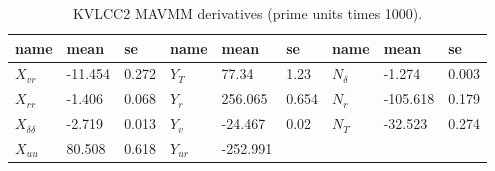 \begin{table}[!htb]
    \footnotesize
    \centering
        \caption{KVLCC2 MAVMM derivatives (prime units times 1000).}
    \label{\detokenize{06.20_results_kvlcc2:kvlcc2-derivatives}}
    \begin{tabular}{l l l l l l l l l }
\toprule


name
&

mean
&

se
&

name
&

mean
&

se
&

name
&

mean
&

se
\\
\hline

\( X_{vr} \)
&

-11.454
&

0.272
&

\( Y_{T} \)
&

77.34
&

1.23
&

\( N_{\delta} \)
&

-1.274
&

0.003
\\


\( X_{rr} \)
&

-1.406
&

0.068
&

\( Y_{r} \)
&

256.065
&

0.654
&

\( N_{r} \)
&

-105.618
&

0.179
\\


\( X_{\delta\delta} \)
&

-2.719
&

0.013
&

\( Y_{v} \)
&

-24.467
&

0.02
&

\( N_{T} \)
&

-32.523
&

0.274
\\


\( X_{uu} \)
&

80.508
&

0.618
&

\( Y_{ur} \)
&

-252.991
&


\end{tabular}
\end{table}
